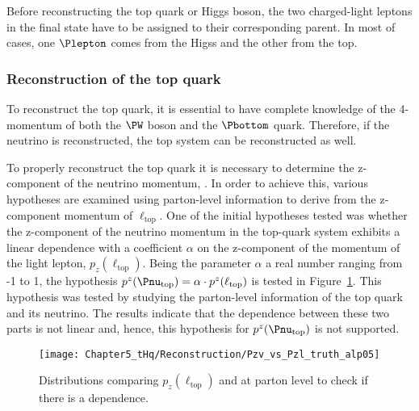 Before reconstructing the top quark or Higgs boson, the two charged-light leptons in the final state have to be
assigned to their corresponding parent. In most of cases, one $\Plepton$ comes from the Higss and the other 
from the top. %

\subsubsection{Reconstruction of the top quark}
\label{sec:ChaptH:Sig:EventReconstruction:top}
To reconstruct the top quark, it is essential to have complete knowledge of the 4-momentum of both 
the $\PW$ boson and the $\Pbottom$ quark. %
Therefore, if the neutrino is reconstructed, the top system can be reconstructed as well. 

To properly reconstruct the top quark it is necessary
 to determine the z-component of the neutrino momentum, \pnutopz. 
In order to achieve this, various hypotheses are examined using parton-level information
to derive \pnutopz from the z-component momentum of $\ell_{\text{top}}$.
One of the initial hypotheses tested was whether the z-component of the neutrino momentum in the top-quark system 
exhibits a linear dependence with a coefficient $\alpha$ on the z-component of the momentum of the light lepton, $p_{z}(\ell_{\text{top}})$. 
Being the parameter $\alpha$ a real number ranging from -1 to 1, the hypothesis $p^{z}(\Pnu_{\text{top}}) = \alpha \cdot p^{z}(\ell_{\text{top}})$
is tested in Figure~\ref{fig:tHq:EventReconstruction:TopSystem:hypothesis1}. 
This hypothesis was tested by studying the parton-level information of the top quark and its neutrino. The results indicate that the dependence between these two parts is not linear and, hence, this hypothesis for $p^{z}(\Pnu_{\text{top}})$ is not supported.
\begin{figure}[h] 
	\centering
	\texttt{[image: Chapter5\_tHq/Reconstruction/Pzv\_vs\_Pzl\_truth\_alp05]}
	\caption{Distributions comparing $p_{z}(\ell_{\text{top}})$ and \pnutopz at 
	parton level to check if there is a dependence.}	
	\label{fig:tHq:EventReconstruction:TopSystem:hypothesis1}
\end{figure}

